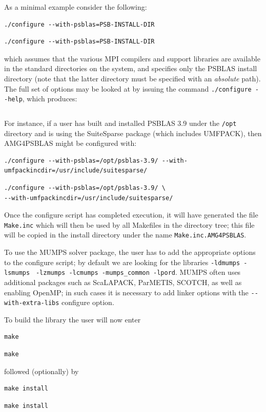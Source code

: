 As a minimal example consider the following:
\ifpdf
\begin{verbatim}
./configure --with-psblas=PSB-INSTALL-DIR
\end{verbatim}
\else
\begin{verbatim}
./configure --with-psblas=PSB-INSTALL-DIR
\end{verbatim}
\fi
which assumes that the various MPI compilers and support libraries are
available in the standard directories on the system, and specifies
only the PSBLAS install  directory (note that the latter directory must
be specified with an {\em absolute} path).
The full set of options may be looked at by issuing the command
\verb|./configure --help|, which produces:
\ifpdf
\inputminted[breaklines=true,bgcolor=bg,fontsize=\small]{console}{../configureout.txt}
\else

\fi
For instance, if a user has built and installed PSBLAS 3.9 under the
\verb|/opt| directory and is
using the SuiteSparse package (which includes UMFPACK), then AMG4PSBLAS
might be configured with:
\ifpdf
\begin{verbatim}
./configure --with-psblas=/opt/psblas-3.9/ --with-umfpackincdir=/usr/include/suitesparse/
\end{verbatim}
\else
\begin{verbatim}
./configure --with-psblas=/opt/psblas-3.9/ \
--with-umfpackincdir=/usr/include/suitesparse/
\end{verbatim}
\fi
Once the configure script has completed execution, it will have
generated the file \verb|Make.inc| which will then be used by all
Makefiles in the directory tree; this file will be copied in the
install directory under the name \verb|Make.inc.AMG4PSBLAS|.

To use the MUMPS solver package,
the user has to add the appropriate options to the configure script;
by default we are looking for the libraries
\verb|-ldmumps -lsmumps| \verb| -lzmumps -lcmumps -mumps_common -lpord|.
MUMPS often uses additional packages such as ScaLAPACK, ParMETIS,
SCOTCH, as well as enabling OpenMP; in such cases it is necessary to
add linker options with the \verb|--with-extra-libs| configure option.

To build the library the user will now enter
\ifpdf
\begin{verbatim}
make
\end{verbatim}
\else
\begin{verbatim}
make
\end{verbatim}
\fi
followed (optionally) by
\ifpdf
\begin{verbatim}
make install
\end{verbatim}
\else
\begin{verbatim}
make install
\end{verbatim}
\fi
